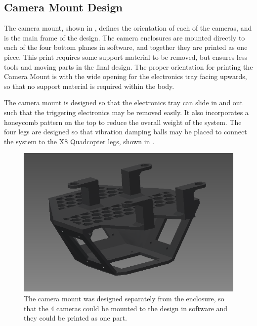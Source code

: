 	\subsection{Camera Mount Design}
	The camera mount, shown in , defines the orientation of each of the cameras, and is the main frame of the design.  The camera enclosures are mounted directly to each of the four bottom planes in software, and together they are printed as one piece.  This print requires some support material to be removed, but ensures less tools and moving parts in the final design.  The proper orientation for printing the Camera Mount is with the wide opening for the electronics tray facing upwards, so that no support material is required within the body.

	The camera mount is designed so that the electronics tray can slide in and out such that the triggering electronics may be removed easily.  It also incorporates a honeycomb pattern on the top to reduce the overall weight of the system.  The four legs are designed so that vibration damping balls may be placed to connect the system to the X8 Quadcopter legs, shown in .  
	\begin{figure}[H]
		\centering
		\includegraphics[scale = 0.4]{../figures/cad/mount.png}
		\caption{The camera mount was designed separately from the enclosure, so that the 4 cameras could be mounted to the design in software and they could be printed as one part.}
		\label{fig:mount}
	\end{figure}
	
